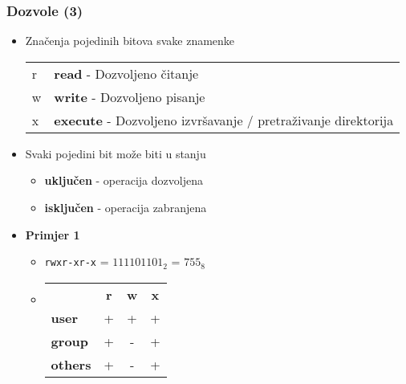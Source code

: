 \documentclass[table,usenames,dvipsnames]{beamer}
\newcommand{\shell}[1]{\texttt{#1}}
\begin{document}
\begin{frame}[t]
\frametitle{Dozvole (3)}
\begin{itemize}
  \item Značenja pojedinih bitova svake znamenke
    \begin{tabular}{l l}
     r & \textbf{read} - Dozvoljeno čitanje \\
     w & \textbf{write} - Dozvoljeno pisanje \\
     x & \textbf{execute} - Dozvoljeno izvršavanje / pretraživanje direktorija
    \end{tabular}
      \item Svaki pojedini bit može biti u stanju
      \begin{itemize}
      	\item \textbf{uključen} - operacija dozvoljena
      	\item \textbf{isključen} - operacija zabranjena
      \end{itemize}
\end{itemize}
\vfill
\begin{itemize}
  \item \textbf{Primjer 1}
  \begin{itemize}
    \item[] \shell{rwxr-xr-x} = $111101101_2$ = $755_8$
    \item[] \hspace{1em} \begin{tabular}{l c c c}
    	& \textbf{r} & \textbf{w} & \textbf{x}\\
    	\textbf{user} & + & + & +\\
    	\textbf{group} & + & - & +\\
    	\textbf{others} & + & - & +
    \end{tabular}
  \end{itemize}
\end{itemize}
\end{frame}
\end{document}
